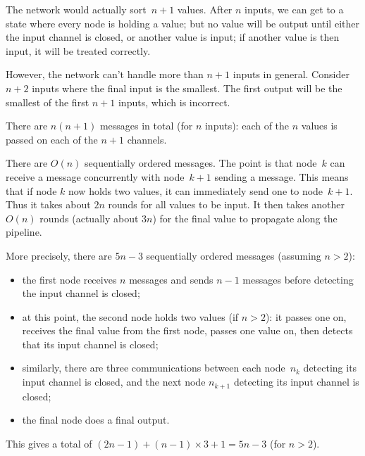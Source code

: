 \begin{answerI}

The network would actually sort~$n+1$ values.
After $n$ inputs, we can get to a state where every node is holding a value;
but no value will be output until either the input channel is closed, or
another value is input; if another value is then input, it will be treated
correctly.

However, the network can't handle more than $n+1$ inputs in general.  Consider
$n+2$ inputs where the final input is the smallest.  The first output will be
the smallest of the first $n+1$ inputs, which is incorrect.

There are $n(n+1)$ messages in total (for $n$ inputs): each of the $n$ values
is passed on each of the $n+1$ channels.

There are $O(n)$ sequentially ordered messages.  The point is that node~$k$
can receive a message concurrently with node~$k+1$ sending a message.  This
means that if node $k$ now holds two values, it can immediately send one to
node~$k+1$.  Thus it  takes about $2n$ rounds for all values to be input.  It
then takes another $O(n)$ rounds (actually about $3n$) for the final value to
propagate along the pipeline.

More precisely, there are $5n-3$ sequentially ordered messages (assuming $n >
2$):
\begin{itemize}
\item the first node receives $n$ messages and sends $n-1$ messages before
  detecting the input channel is closed; 

\item at this point, the second node holds two values (if $n>2$): it passes
  one on, receives the final value from the first node, passes one value on,
  then detects that its input channel is closed;

\item similarly, there are three communications between each node~$n_k$ 
  detecting its input channel is closed, and the next node $n_{k+1}$ detecting
  its input channel is closed;

\item the final node does a final output. 
\end{itemize}
% 
This gives a total of $(2n-1) + (n-1)\times 3 + 1 = 5n-3$ (for $n>2$).  
\end{answerI}
